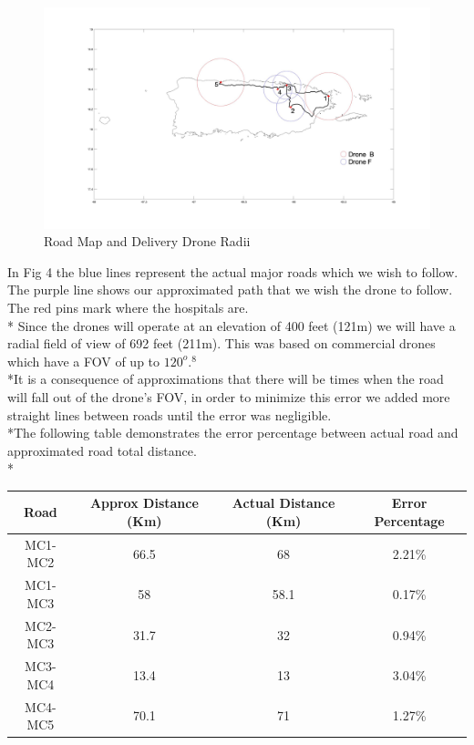 \documentclass[a4paper,12pt]{article}
\begin{document}
\begin{figure}[h]
\centering
\includegraphics[scale =0.15]{CircleRoadMap}
\caption{Road Map and Delivery Drone Radii}
\label{road-approx}
\end{figure}

\newpage
In Fig 4 the blue lines represent the actual major roads which we wish to follow. The purple line shows our approximated path that we wish the drone to follow. The red pins mark where the hospitals are.\\*
Since the drones will operate at an elevation of 400 feet (121m) we will have a radial field of view of 692 feet (211m). This was based on commercial drones which have a FOV of up to $120^{o}$$.^{8}$
\\*It is a consequence of approximations that there will be times when the road will fall out of the drone's FOV, in order to minimize this error we added more straight lines between roads until the error was negligible.
\\*The following table demonstrates the error percentage between actual road and approximated road total distance.\\*

\begin{center}
\begin{tabular}{ |c|c|c|c|}
 \hline
 Road & Approx Distance (Km) & Actual Distance (Km) & Error Percentage \\\hline
  MC1-MC2 & 66.5 & 68 & 2.21\% \\
  MC1-MC3 & 58 & 58.1 & 0.17\% \\
  MC2-MC3 & 31.7 & 32 & 0.94\%  \\
  MC3-MC4 & 13.4 & 13 & 3.04\% \\
  MC4-MC5 & 70.1 & 71 & 1.27\%  \\
 \hline
\end{tabular}
\end{center}
\end{document}

